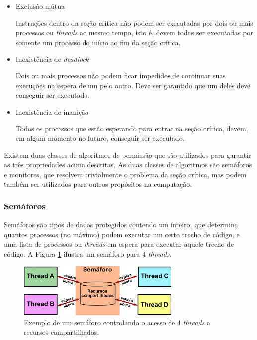 \begin{itemize}
	
	\item Exclusão mútua
	
	 Instruções dentro da seção crítica não podem ser executadas por dois ou mais processos ou \textit{threads} ao mesmo tempo, isto é, devem todas ser executadas por somente um processo do início ao fim da seção crítica.

	\item Inexistência de \textit{deadlock}

	Dois ou mais processos não podem ficar impedidos de continuar suas execuções na  espera de um pelo outro. Deve ser garantido que um deles deve conseguir ser executado.

	\item Inexistência de inanição
	
	 Todos os processos que estão esperando para entrar na seção crítica, devem, em algum momento no futuro, conseguir ser executado.
 
\end{itemize}

Existem duas classes de algoritmos de permissão que são utilizados para garantir as três propriedades acima descritas. As duas classes de algoritmos são semáforos e monitores, que resolvem trivialmente o problema da seção crítica, mas podem também ser utilizados para outros propósitos na computação.

\subsubsection{Semáforos}

Semáforos são tipos de dados protegidos contendo um inteiro, que determina quantos processos (no máximo) podem executar um certo trecho de código, e uma lista de processos ou \textit{threads} em espera para executar aquele trecho de código. A Figura \ref{fig:semaforo} ilustra um semáforo para 4 \textit{threads}.

\begin{figure}[htbp]
	\centering
	\includegraphics[width=0.7\textwidth]{fig/semaforo.png}
	\caption{Exemplo de um semáforo controlando o acesso de 4 \textit{threads} a recursos compartilhados.} 
	\label{fig:semaforo}
\end{figure}

